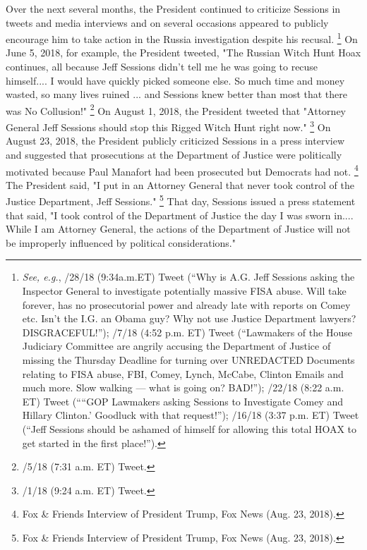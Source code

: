 {Over the next several months, the President continued to criticize Sessions in tweets and media interviews and on several occasions appeared to publicly encourage him to take action in the Russia investigation despite his recusal.%
\footnote{\textit{See, e.g.}, /28/18 (9:34a.m.ET) Tweet (“Why is A.G. Jeff Sessions asking the Inspector General to investigate potentially massive FISA abuse.
Will take forever, has no prosecutorial power and already late with reports on Comey etc.
Isn’t the I.G. an Obama guy?
Why not use Justice Department lawyers?
DISGRACEFUL!”);
/7/18 (4:52 p.m. ET) Tweet (“Lawmakers of the House Judiciary Committee are angrily accusing the Department of Justice of missing the Thursday Deadline for turning over UNREDACTED Documents relating to FISA abuse, FBI, Comey, Lynch, McCabe, Clinton Emails and much more.
Slow walking — what is going on? BAD!”);
/22/18 (8:22 a.m. ET) Tweet (““GOP Lawmakers asking Sessions to Investigate Comey and Hillary Clinton.’ \@FoxNews Goodluck with that request!”);
/16/18 (3:37 p.m. ET) Tweet (“Jeff Sessions should be ashamed of himself for allowing this total HOAX to get started in the first place!”).}
On June 5, 2018, for example, the President tweeted, "The Russian Witch Hunt Hoax continues, all because Jeff Sessions didn't tell me he was going to recuse himself.... I would have quickly picked someone else.
So much time and money wasted, so many lives ruined ... and Sessions knew better than most that there was No Collusion!"%
\footnote{/5/18 (7:31 a.m. ET) Tweet.}
On August 1, 2018, the President tweeted that "Attorney General Jeff Sessions should stop this Rigged Witch Hunt right now."%
\footnote{/1/18 (9:24 a.m. ET) Tweet.}
On August 23, 2018, the President publicly criticized Sessions in a press interview and suggested that prosecutions at the Department of Justice were politically motivated because Paul Manafort had been prosecuted but Democrats had not.%
\footnote{Fox \& Friends Interview of President Trump, Fox News (Aug. 23, 2018).}
The President said, "I put in an Attorney General that never took control of the Justice Department, Jeff Sessions."%
\footnote{Fox \& Friends Interview of President Trump, Fox News (Aug. 23, 2018).}
That day, Sessions issued a press statement that said, "I took control of the Department of Justice the day I was sworn in....
While I am Attorney General, the actions of the Department of Justice will not be improperly influenced by political considerations."%
}
